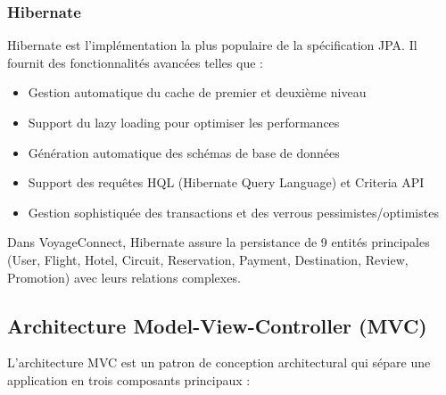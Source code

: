 \documentclass[12pt,a4paper]{report}
\begin{document}
\subsubsection{Hibernate}

Hibernate est l'implémentation la plus populaire de la spécification JPA. Il fournit des fonctionnalités avancées telles que :

\begin{itemize}
    \item Gestion automatique du cache de premier et deuxième niveau
    \item Support du lazy loading pour optimiser les performances
    \item Génération automatique des schémas de base de données
    \item Support des requêtes HQL (Hibernate Query Language) et Criteria API
    \item Gestion sophistiquée des transactions et des verrous pessimistes/optimistes
\end{itemize}

Dans VoyageConnect, Hibernate assure la persistance de 9 entités principales (User, Flight, Hotel, Circuit, Reservation, Payment, Destination, Review, Promotion) avec leurs relations complexes.

\subsection{Architecture Model-View-Controller (MVC)}

L'architecture MVC est un patron de conception architectural qui sépare une application en trois composants principaux :
\end{document}
